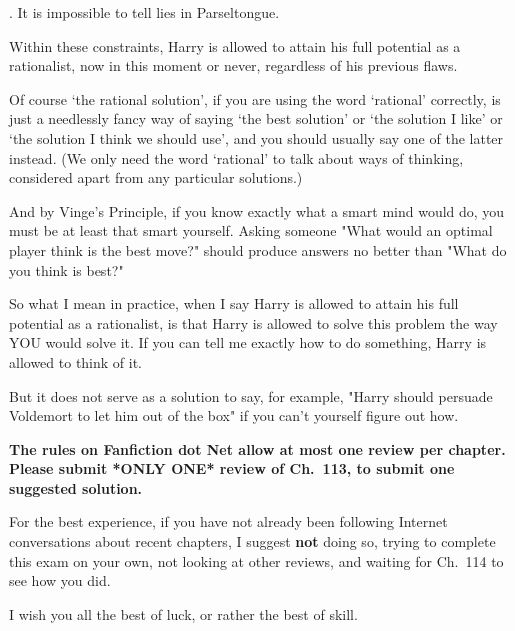 \vspace*{.5\baselineskip}. It is impossible to tell lies in Parseltongue.

\vspace*{.5\baselineskip}\noindent
Within these constraints,
Harry is allowed to attain his full potential as a rationalist,
now in this moment or never,
regardless of his previous flaws.

\vspace*{.5\baselineskip}\noindent
Of course `the rational solution',
if you are using the word `rational' correctly,
is just a needlessly fancy way of saying `the best solution'
or `the solution I like' or `the solution I think we should use',
and you should usually say one of the latter instead.
(We only need the word `rational' to talk about ways of thinking,
considered apart from any particular solutions.)

\vspace*{.5\baselineskip}\noindent
And by Vinge's Principle,
if you know exactly what a smart mind would do,
you must be at least that smart yourself.
Asking someone "What would an optimal player think is the best move?"
should produce answers no better than "What do you think is best?"

\vspace*{.5\baselineskip}\noindent
So what I mean in practice,
when I say Harry is allowed to attain his full potential as a
rationalist,
is that Harry is allowed to solve this problem
the way YOU would solve it.
If you can tell me exactly how to do something,
Harry is allowed to think of it.

\vspace*{.5\baselineskip}\noindent
But it does not serve as a solution to say, for example,
"Harry should persuade Voldemort to let him out of the box"
if you can't yourself figure out how.

\vspace*{.5\baselineskip}\noindent
\textbf{The rules on Fanfiction dot Net allow at most one review per
chapter.
Please submit *ONLY ONE* review of Ch.~113,
to submit one suggested solution.}

\vspace*{.5\baselineskip}\noindent
For the best experience, if you have not already been following
Internet conversations about recent chapters, I suggest
\textbf{not} doing so,
trying to complete this exam on your own,
not looking at other reviews,
and waiting for Ch.~114 to see how you did.

\vspace*{.5\baselineskip}\noindent
I wish you all the best of luck, or rather the best of skill.

